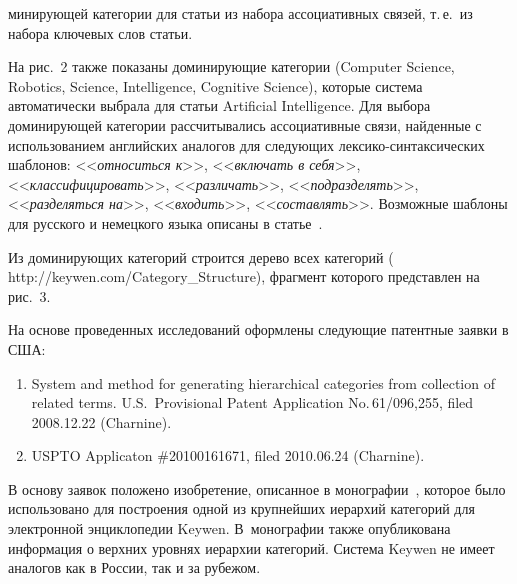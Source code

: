 \begin{multicols}{2}

\noindent
минирующей категории для статьи из набора 
ассоциативных связей, т.\,е.\ из набора ключевых слов статьи. 
    

     
     На рис.~2 также показаны доминирующие категории (Computer 
Science, Robotics, Science, Intelligence, Cognitive Science), которые система 
автома\-тически выбрала для статьи Artificial Intelligence. Для выбора 
доминирующей категории рассчитывались ассоциативные связи, 
найденные с использованием английских аналогов для следующих 
     лек\-си\-ко-син\-так\-си\-че\-ских шаблонов: <<\textit{относиться 
к}>>, <<\textit{включать в себя}>>, <<\textit{классифицировать}>>, 
<<\textit{различать}>>, <<\textit{подразделять}>>, 
<<\textit{разделяться на}>>, <<\textit{входить}>>, 
<<\textit{составлять}>>. Возможные шаблоны для русского и немецкого 
языка описаны в статье~\cite{15-koz}.
     
      Из доминирующих категорий строится дерево всех категорий ({\sf 
http://keywen.com/Category\_\linebreak Structure}), фрагмент которого представлен 
на рис.~3.
    

    
     На основе проведенных исследований оформлены следующие 
патентные заявки в США:
     \begin{enumerate}[1.]
\item System and method for generating hierarchical categories from 
collection of related terms. U.S.\ Provisional Patent Application 
No.\,61/096,255, filed 2008.12.22 (Charnine).
\item USPTO Applicaton \#20100161671, filed 2010.06.24 (Charnine).
\end{enumerate}

     В основу заявок положено изобретение, описанное в 
монографии~\cite{6-koz}, которое было использовано для построения 
одной из крупнейших иерархий категорий для электронной энциклопедии 
Keywen. В~монографии также опубликована информация о верхних 
уровнях иерархии категорий. Система Keywen не имеет аналогов как в 
России, так и за рубежом.
     

\end{multicols}
